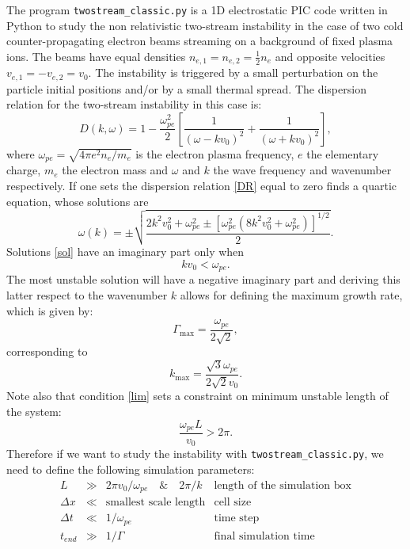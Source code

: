 \documentclass[]{exam}
\begin{document}
The program \texttt{twostream_classic.py} is a 1D electrostatic PIC code written in Python to study the non relativistic two-stream instability in the case of two cold counter-propagating electron beams streaming on a background of fixed plasma ions. The beams have equal densities $n_{e,1}=n_{e,2}=\frac{1}{2}n_e$ and opposite velocities $v_{e,1}=-v_{e,2}=v_0$. The instability is triggered by a small perturbation on the particle initial positions and/or by a small thermal spread. The dispersion relation for the two-stream instability in this case is:
\begin{equation}
D(k,\omega) = 1-\frac{\omega_{pe}^2}{2}\left[\frac{1}{(\omega-kv_0)^2}+\frac{1}{(\omega+kv_0)^2}\right], \label{DR}
\end{equation}
where $\omega_{pe}=\sqrt{4\pi e^2 n_e/m_e}$ is the electron plasma frequency, $e$ the elementary charge, $m_e$ the electron mass and $\omega$ and $k$ the wave frequency and wavenumber respectively. If one sets the dispersion relation \eqref{DR} equal to zero finds a quartic equation, whose solutions are
\begin{equation}
\omega(k) = \pm \sqrt{\frac{2 k^2 v_0^2+\omega_{pe}^2 \pm \left[\omega_{pe}^2 \left(8k^2v_0^2+\omega_{pe}^2 \right) \right]^{1/2}}{2}}. \label{sol}
\end{equation}
Solutions \eqref{sol} have an imaginary part only when
\begin{equation}
kv_0<\omega_{pe}. \label{lim}
\end{equation}  
The most unstable solution will have a negative imaginary part and deriving this latter respect to the wavenumber $k$ allows for defining the maximum growth rate, which is given by:
\begin{equation}
\Gamma_{\text{max}}=\frac{\omega_{pe}}{2\sqrt{2}},
\end{equation}
corresponding to
\begin{equation}
k_{\text{max}}=\frac{\sqrt{3} \omega_{pe}}{2 \sqrt{2} v_0}.
\end{equation}
Note also that condition \eqref{lim} sets a constraint on minimum unstable length of the system:
\begin{equation}
\frac{\omega_{pe}L}{v_0}>2\pi.
\end{equation}
Therefore if we want to study the instability with \texttt{twostream_classic.py}, we need to define the following simulation parameters:
\begin{equation*}
\begin{matrix}
L & \gg& 2\pi v_0/\omega_{pe} \quad \& \quad 2 \pi/k & \text{length of the simulation box} \\
\Delta x & \ll & \text{smallest scale length} & \text{cell size} \\
\Delta t & \ll & 1/\omega_{pe} & \text{time step} \\
t_{end} & \gg & 1/\Gamma & \text{final simulation time}
\end{matrix}
\end{equation*}
 
\end{document}
